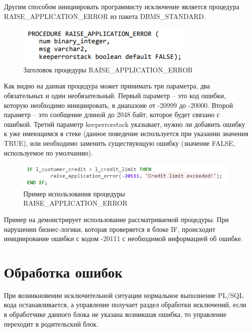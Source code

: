 Другим способом инициировать программисту исключение является процедура RAISE\_APPLICATION\_ERROR из пакета DBMS\_STANDARD.

\begin{figure}[ht!] 
	\center
	\includegraphics [scale=1] {my_folder/img/C1_raise_application_error_signature}
	\caption{Заголовок процедуры RAISE\_APPLICATION\_ERROR} 
	\label{fig:C1_raise_application_error_signature}  
\end{figure}
\FloatBarrier

Как видно на  данная процедура может принимать три параметра, два обязательных и один необязательный. Первый параметр – это код ошибки, которую необходимо инициировать, в диапазоне от -20999 до -20000. Второй параметр – это сообщение длиной до 2048 байт, которое будет связано с ошибкой. Третий параметр keeperrorstack указывает, нужно ли добавить ошибку к уже имеющимся в стеке (данное поведение используется при указании значения TRUE), или необходимо заменить существующую ошибку (значение FALSE, используемое по умолчанию).

\begin{figure}[ht!] 
	\center
	\includegraphics [scale=1] {my_folder/img/C1_raise_application_error_example}
	\caption{Пример использования процедуры RAISE\_APPLICATION\_ERROR} 
	\label{fig:C1_raise_application_error_example}  
\end{figure}
\FloatBarrier

Пример на  демонстрирует использование рассматриваемой процедуры. При нарушении бизнес-логики, которая проверяется в блоке IF, происходит инициирование ошибки с кодом -20111 с необходимой информацией об ошибке. 

\section{Обработка ошибок}\label{ch1:sec4}

При возникновении исключительной ситуации нормальное выполнение PL/SQL кода останавливается, а управление получает раздел обработки исключений, если в обработчике данного блока не указана возникшая ошибка, то управление переходит в родительский блок. 

